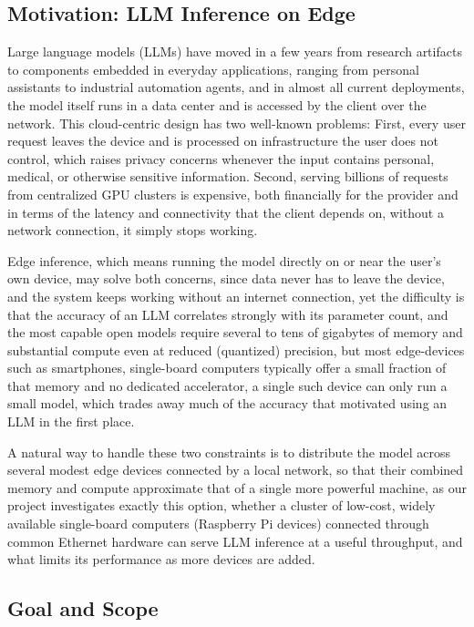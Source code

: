 \documentclass[11pt,a4paper]{article}
\begin{document}
\subsection{Motivation: LLM Inference on Edge}\label{sec:n1_1}

Large language models (LLMs) have moved in a few years from research artifacts to components embedded in everyday applications, ranging from personal assistants to industrial automation agents, and in almost all current deployments, the model itself runs in a data center and is accessed by the client over the network. This cloud-centric design has two well-known problems: First, every user request leaves the device and is processed on infrastructure the user does not control, which raises privacy concerns whenever the input contains personal, medical, or otherwise sensitive information. Second, serving billions of requests from centralized GPU clusters is expensive, both financially for the provider and in terms of the latency and connectivity that the client depends on, without a network connection, it simply stops working.

Edge inference, which means running the model directly on or near the user's own device, may solve both concerns, since data never has to leave the device, and the system keeps working without an internet connection, yet the difficulty is that the accuracy of an LLM correlates strongly with its parameter count, and the most capable open models require several to tens of gigabytes of memory and substantial compute even at reduced (quantized) precision, but most edge-devices such as smartphones, single-board computers typically offer a small fraction of that memory and no dedicated accelerator, a single such device can only run a small model, which trades away much of the accuracy that motivated using an LLM in the first place.

A natural way to handle these two constraints is to distribute the model across several modest edge devices connected by a local network, so that their combined memory and compute approximate that of a single more powerful machine, as our project investigates exactly this option, whether a cluster of low-cost, widely available single-board computers (Raspberry Pi devices) connected through common Ethernet hardware can serve LLM inference at a useful throughput, and what limits its performance as more devices are added.

\subsection{Goal and Scope}\label{sec:scope}
\end{document}
